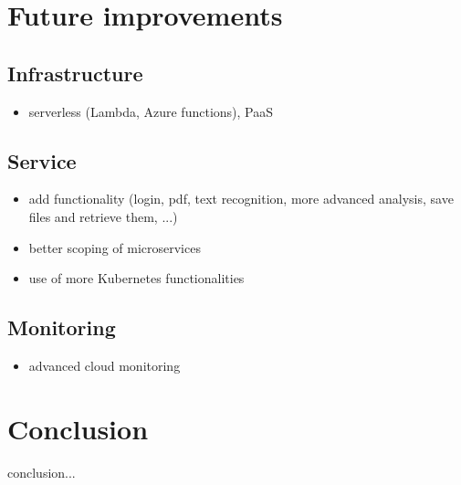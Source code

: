 \documentclass[conference]{IEEEtran}
\begin{document}
\section{Future improvements}
\label{sec:future-improvments}
\subsection{Infrastructure}
\begin{itemize}
	\item serverless (Lambda, Azure functions),  PaaS
\end{itemize}

\subsection{Service}
\begin{itemize}
	\item add functionality (login, pdf, text recognition, more advanced analysis, save files and retrieve them, ...)
	\item better scoping of microservices
	\item use of more Kubernetes functionalities
\end{itemize}

\subsection{Monitoring}
\begin{itemize}
	\item advanced cloud monitoring
\end{itemize}

\section{Conclusion}
\label{sec:conclusion}
conclusion...




\end{document}
